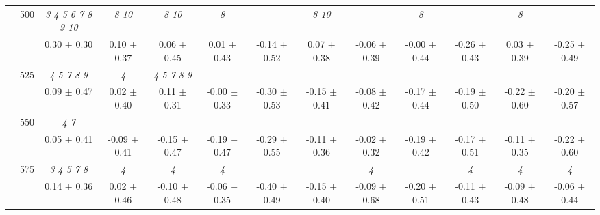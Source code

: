 \begin{table}[h]
{\begin{tabular}{
        ccccccccccccc}
 & \multirow{2}{*}{500}& \textit{  3  4  5  6  7  8  9 10 }& \textit{  8 10 }& \textit{  8 10 }& \textit{ 8 }& & \textit{  8 10 }& & \textit{ 8 }& & \textit{ 8 }&  \\ 
 & & 0.30 $\pm$ 0.30& 0.10 $\pm$ 0.37& 0.06 $\pm$ 0.45& 0.01 $\pm$ 0.43& -0.14 $\pm$ 0.52& 0.07 $\pm$ 0.38& -0.06 $\pm$ 0.39& -0.00 $\pm$ 0.44& -0.26 $\pm$ 0.43& 0.03 $\pm$ 0.39& -0.25 $\pm$ 0.49 \\ 
 & \multirow{2}{*}{525}& \cellcolor[HTML]{EFEFEF} \textit{ 4 5 7 8 9 }& \cellcolor[HTML]{EFEFEF} \textit{ 4 }& \cellcolor[HTML]{EFEFEF} \textit{ 4 5 7 8 9 }& \cellcolor[HTML]{EFEFEF} & \cellcolor[HTML]{EFEFEF} & \cellcolor[HTML]{EFEFEF} & \cellcolor[HTML]{EFEFEF} & \cellcolor[HTML]{EFEFEF} & \cellcolor[HTML]{EFEFEF} & \cellcolor[HTML]{EFEFEF} & \cellcolor[HTML]{EFEFEF}  \\ 
 & & \cellcolor[HTML]{EFEFEF} 0.09 $\pm$ 0.47& \cellcolor[HTML]{EFEFEF} 0.02 $\pm$ 0.40& \cellcolor[HTML]{EFEFEF} 0.11 $\pm$ 0.31& \cellcolor[HTML]{EFEFEF} -0.00 $\pm$ 0.33& \cellcolor[HTML]{EFEFEF} -0.30 $\pm$ 0.53& \cellcolor[HTML]{EFEFEF} -0.15 $\pm$ 0.41& \cellcolor[HTML]{EFEFEF} -0.08 $\pm$ 0.42& \cellcolor[HTML]{EFEFEF} -0.17 $\pm$ 0.44& \cellcolor[HTML]{EFEFEF} -0.19 $\pm$ 0.50& \cellcolor[HTML]{EFEFEF} -0.22 $\pm$ 0.60& \cellcolor[HTML]{EFEFEF} -0.20 $\pm$ 0.57 \\ 
 & \multirow{2}{*}{550}& \textit{ 4 7 }& & & & & & & & & &  \\ 
 & & 0.05 $\pm$ 0.41& -0.09 $\pm$ 0.41& -0.15 $\pm$ 0.47& -0.19 $\pm$ 0.47& -0.29 $\pm$ 0.55& -0.11 $\pm$ 0.36& -0.02 $\pm$ 0.32& -0.19 $\pm$ 0.42& -0.17 $\pm$ 0.51& -0.11 $\pm$ 0.35& -0.22 $\pm$ 0.60 \\ 
 & \multirow{2}{*}{575}& \cellcolor[HTML]{EFEFEF} \textit{ 3 4 5 7 8 }& \cellcolor[HTML]{EFEFEF} \textit{ 4 }& \cellcolor[HTML]{EFEFEF} \textit{ 4 }& \cellcolor[HTML]{EFEFEF} \textit{ 4 }& \cellcolor[HTML]{EFEFEF} & \cellcolor[HTML]{EFEFEF} & \cellcolor[HTML]{EFEFEF} \textit{ 4 }& \cellcolor[HTML]{EFEFEF} & \cellcolor[HTML]{EFEFEF} \textit{ 4 }& \cellcolor[HTML]{EFEFEF} \textit{ 4 }& \cellcolor[HTML]{EFEFEF} \textit{ 4 } \\ 
 & & \cellcolor[HTML]{EFEFEF} 0.14 $\pm$ 0.36& \cellcolor[HTML]{EFEFEF} 0.02 $\pm$ 0.46& \cellcolor[HTML]{EFEFEF} -0.10 $\pm$ 0.48& \cellcolor[HTML]{EFEFEF} -0.06 $\pm$ 0.35& \cellcolor[HTML]{EFEFEF} -0.40 $\pm$ 0.49& \cellcolor[HTML]{EFEFEF} -0.15 $\pm$ 0.40& \cellcolor[HTML]{EFEFEF} -0.09 $\pm$ 0.68& \cellcolor[HTML]{EFEFEF} -0.20 $\pm$ 0.51& \cellcolor[HTML]{EFEFEF} -0.11 $\pm$ 0.43& \cellcolor[HTML]{EFEFEF} -0.09 $\pm$ 0.48& \cellcolor[HTML]{EFEFEF} -0.06 $\pm$ 0.44 \\ 

\end{tabular}}
\end{table}
